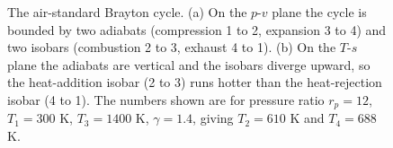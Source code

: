 \begin{figure}[htbp]
\caption[Brayton cycle on the pressure-volume and temperature-entropy
planes]{The air-standard Brayton cycle. (a) On the $p$-$v$ plane the cycle is
bounded by two adiabats (compression 1 to 2, expansion 3 to 4) and two isobars
(combustion 2 to 3, exhaust 4 to 1). (b) On the $T$-$s$ plane the adiabats are
vertical and the isobars diverge upward, so the heat-addition isobar (2 to 3)
runs hotter than the heat-rejection isobar (4 to 1). The numbers shown are for
pressure ratio $r_p = 12$, $T_1 = 300$ K, $T_3 = 1400$ K, $\gamma = 1.4$, giving
$T_2 = 610$ K and $T_4 = 688$ K.}
\label{fig:vol04ch03:brayton-pv-ts}
\end{figure}
